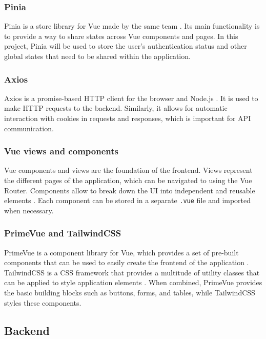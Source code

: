 \subsubsection{Pinia}

Pinia is a store library for Vue made by the same team \parencite{pinia}. Its main functionality is to provide a way to share states across Vue components and pages. In this project, Pinia will be used to store the user's authentication status and other global states that need to be shared within the application.

\subsubsection{Axios}

Axios is a promise-based HTTP client for the browser and Node.js \parencite{axios}. It is used to make HTTP requests to the backend. Similarly, it allows for automatic interaction with cookies in requests and responses, which is important for API communication.

\subsubsection{Vue views and components}

Vue components and views are the foundation of the frontend. Views represent the different pages of the application, which can be navigated to using the Vue Router. Components allow to break down the UI into independent and reusable elements \parencite{vuecomponents}. Each component can be stored in a separate \lstinline{.vue} file and imported when necessary.

\subsubsection{PrimeVue and TailwindCSS}

PrimeVue is a component library for Vue, which provides a set of pre-built components that can be used to easily create the frontend of the application \parencite{primevue}. TailwindCSS is a CSS framework that provides a multitude of utility classes that can be applied to style application elements \parencite{tailwind}. When combined, PrimeVue provides the basic building blocks such as buttons, forms, and tables, while TailwindCSS styles these components.

\subsection{Backend}

